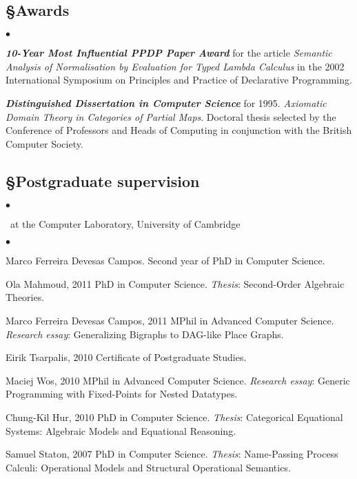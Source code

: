 \documentclass[11pt,twocolumn]{article}
\newenvironment{myitemize}
  {\begin{list}{$\bullet$}
  {\setlength{\topsep}{1pt}
   \setlength{\partopsep}{1pt}
   \setlength{\itemsep}{0pt}
   \setlength{\parsep}{0pt}
   \setlength{\leftmargin}{1em}
   \setlength{\labelwidth}{.5em}}}
  {\end{list}}
\begin{document}
\subsection*{\S\enspace\thinspace Awards}

\begin{myitemize}
\item
\textbf{\em 10-Year Most Influential PPDP Paper Award} for the article
\emph{Semantic Analysis of Normalisation by Evaluation for Typed Lambda
Calculus} in the 2002 International Symposium on Principles and Practice
of Declarative Programming.

\item
\textbf{\em Distinguished Dissertation in Computer Science} for 1995.
\emph{Axiomatic Domain Theory in Categories of Partial Maps}.  Doctoral
thesis selected by the Conference of Professors and Heads of Computing in
conjunction with the British Computer Society.
\end{myitemize}

\subsection*{\S\enspace\thinspace Postgraduate supervision}
\vspace*{-1.9mm}
\begin{myitemize}
\item[]\small\ at the Computer Laboratory, University of Cambridge
\end{myitemize}

\begin{myitemize}
\item
  Marco Ferreira Devesas Campos.  Second year of PhD in Computer Science.

\item
  Ola Mahmoud, 2011 PhD in Computer Science.  \emph{Thesis}: Second-Order
  Algebraic Theories.

\item
  Marco Ferreira Devesas Campos, 2011 MPhil in Advanced Computer Science.
  \emph{Research essay}: Generalizing Bigraphs to DAG-like Place Graphs.

\item
  Eirik Tsarpalis, 2010 Certificate of Postgraduate Studies.

\item
  Maciej Wos, 2010 MPhil in Advanced Computer Science. \emph{Research essay}:
  Generic Programming with Fixed-Points for Nested Datatypes.

\item
  Chung-Kil Hur, 2010 PhD in Computer Science.  \emph{Thesis}: Categorical
  Equational Systems: Algebraic Models and Equational Reasoning.

\item
  Samuel Staton, 2007 PhD in Computer Science.  \emph{Thesis}:
  Name-Passing Process Calculi: Operational Models and Structural
  Operational Semantics.
\end{myitemize}
\end{document}
